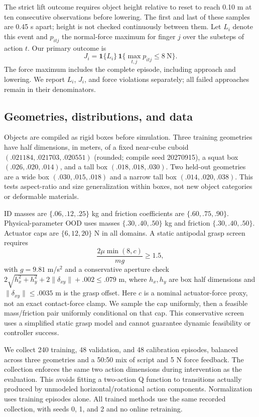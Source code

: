 \documentclass[letterpaper,10pt,conference]{ieeeconf}
\begin{document}
The strict lift outcome requires object height relative to reset to reach
0.10 m at ten consecutive observations before lowering. The first and last
of these samples are 0.45 s apart; height is not checked continuously between
them. Let $L_i$ denote this event and $p_{itj}$ the normal-force maximum for
finger $j$ over the substeps of action $t$. Our primary outcome is
\begin{equation}
J_i=\mathbf{1}\{L_i\}\,\mathbf{1}\{\max_{t,j}p_{itj}\leq8\ \mathrm{N}\}.
\label{eq:joint}
\end{equation}
The force maximum includes the complete episode, including approach and
lowering. We report $L_i$, $J_i$, and force violations separately; all failed
approaches remain in their denominators.

\subsection{Geometries, distributions, and data}
Objects are compiled as rigid boxes before simulation. Three training
geometries have half dimensions, in meters, of a fixed near-cube cuboid
$(.021184,.021703,.020551)$ (rounded; compile seed 20270915), a squat box
$(.026,.020,.014)$, and a tall box $(.018,.018,.030)$.
Two held-out geometries are a wide box
$(.030,.015,.018)$ and a narrow tall box $(.014,.020,.038)$.
This tests aspect-ratio and size generalization within boxes, not new object
categories or deformable materials.

ID masses are $\{.06,.12,.25\}$ kg and friction coefficients are
$\{.60,.75,.90\}$. Physical-parameter OOD uses masses
$\{.30,.40,.50\}$ kg and friction $\{.30,.40,.50\}$.
Actuator caps are $\{6,12,20\}$ N in all domains. A static antipodal
grasp screen requires
\begin{equation}
\frac{2\mu\min(8,c)}{mg}\geq1.5,
\label{eq:screen}
\end{equation}
with $g=9.81$ m/s$^2$ and a conservative aperture check
$2\sqrt{h_x^2+h_y^2}+2\|\delta_{xy}\|+.002\leq.079$ m,
where $h_x,h_y$ are box half dimensions and $\|\delta_{xy}\|\leq.0035$ m
is the grasp offset. Here $c$ is a nominal actuator-force proxy, not an
exact contact-force clamp. We sample the cap uniformly, then a feasible
mass/friction pair uniformly conditional on that cap. This conservative
screen uses a simplified static grasp model and cannot guarantee dynamic
feasibility or controller success.

We collect 240 training, 48 validation, and 48 calibration episodes, balanced
across three geometries and a 50:50 mix of script and 5 N force feedback.
The collection enforces the same two action dimensions during intervention
as the evaluation. This avoids fitting a two-action Q function to transitions
actually produced by unmodeled horizontal/rotational action components.
Normalization uses training episodes alone. All trained methods use the same
recorded collection, with seeds 0, 1, and 2 and no online retraining.
\end{document}
